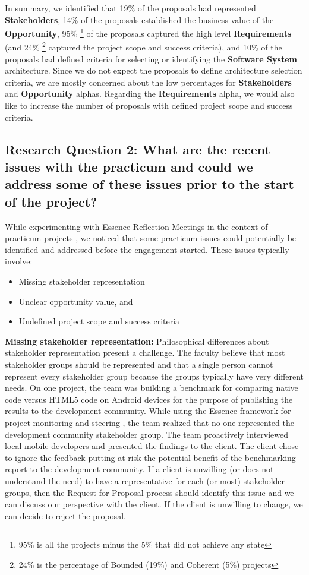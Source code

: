 \documentclass[conference]{IEEEtran}
\begin{document}
In summary, we identified that 19\% of the proposals had represented
\textbf{Stakeholders}, 14\% of the proposals established the business value
of the \textbf{Opportunity}, 95\% \footnote{95\% is all the projects minus the 5\% that did not achieve any state} of the proposals captured the high level \textbf{Requirements} (and 24\% \footnote{24\% is the percentage of Bounded (19\%) and Coherent (5\%) projects} captured the project scope and success criteria), and 10\% of the proposals had defined criteria for selecting or identifying the \textbf{Software System} architecture. Since we do not expect the proposals to define architecture selection criteria, we are mostly concerned about the low
percentages for \textbf{Stakeholders} and \textbf{Opportunity} alphas. Regarding
the \textbf{Requirements} alpha, we would also like to increase the number of
proposals with defined project scope and success criteria.


\subsection{Research Question 2: What are the recent
issues with the practicum and could we address some of these issues
prior to the start of the project?}

While experimenting with Essence Reflection Meetings in the
context of practicum projects \cite{EASE2014, ICSE2014}, we
noticed that some practicum issues could potentially be identified and
addressed before the engagement started. These issues typically involve:

\begin{itemize}
\itemsep1pt\parskip0pt
\item
  Missing stakeholder representation
\item
  Unclear opportunity value, and
\item
  Undefined project scope and success criteria
\end{itemize}

\textbf{Missing stakeholder representation:} Philosophical differences about
stakeholder representation present a challenge. The faculty believe that
most stakeholder groups should be represented and that a single
person cannot represent every stakeholder group because the groups
typically have very different needs. On one project, the team was building
a benchmark for comparing native code versus HTML5 code
on Android devices for the purpose of publishing the results to the
development community. While using the Essence framework for project
monitoring and steering \cite{ICSE2014}, the team
realized that no one represented the development community stakeholder
group. The team proactively interviewed local mobile developers and
presented the findings to the client. The client chose to ignore the
feedback putting at risk the potential benefit of the benchmarking
report to the development community. If a client is unwilling (or does
not understand the need) to have a representative for each (or most)
stakeholder groups, then the Request for Proposal process should
identify this issue and we can discuss our perspective with the client. If
the client is unwilling to change, we can decide to reject the
proposal.
\end{document}
